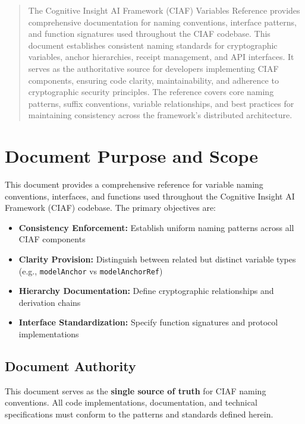\documentclass[12pt,a4paper]{article}
\begin{document}
\begin{abstract}
The Cognitive Insight AI Framework (CIAF) Variables Reference provides comprehensive documentation for naming conventions, interface patterns, and function signatures used throughout the CIAF codebase. This document establishes consistent naming standards for cryptographic variables, anchor hierarchies, receipt management, and API interfaces. It serves as the authoritative source for developers implementing CIAF components, ensuring code clarity, maintainability, and adherence to cryptographic security principles. The reference covers core naming patterns, suffix conventions, variable relationships, and best practices for maintaining consistency across the framework's distributed architecture.
\end{abstract}

\newpage
\tableofcontents
\newpage

\section{Document Purpose and Scope}

This document provides a comprehensive reference for variable naming conventions, interfaces, and functions used throughout the Cognitive Insight AI Framework (CIAF) codebase. The primary objectives are:

\begin{itemize}
\item \textbf{Consistency Enforcement:} Establish uniform naming patterns across all CIAF components
\item \textbf{Clarity Provision:} Distinguish between related but distinct variable types (e.g., \texttt{modelAnchor} vs \texttt{modelAnchorRef})
\item \textbf{Hierarchy Documentation:} Define cryptographic relationships and derivation chains
\item \textbf{Interface Standardization:} Specify function signatures and protocol implementations
\end{itemize}

\subsection{Document Authority}

This document serves as the \textbf{single source of truth} for CIAF naming conventions. All code implementations, documentation, and technical specifications must conform to the patterns and standards defined herein.
\end{document}
